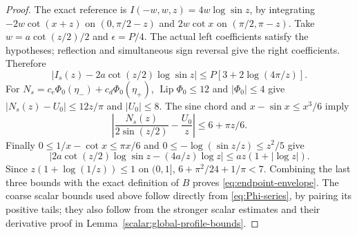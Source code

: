 \begin{proof}
The exact reference is $I(-w,w,z)=4w\log\sin z$, by integrating
$-2w\cot(x+z)$ on $(0,\pi/2-z)$ and $2w\cot x$ on
$(\pi/2,\pi-z)$. Take $w=a\cot(z/2)/2$ and $\epsilon=P/4$.
The actual left coefficients satisfy the hypotheses; reflection and
simultaneous sign reversal give the right coefficients. Therefore
\[
 |I_s(z)-2a\cot(z/2)\log\sin z|
                    \leq P[3+2\log(4\pi/z)].
\]
For $N_s=c_e\Phi_0(\eta_-)+c_d\Phi_0(\eta_+)$,
$\operatorname{Lip}\Phi_0\leq12$ and $|\Phi_0|\leq4$ give
$|N_s(z)-U_0|\leq12z/\pi$ and $|U_0|\leq8$.
The sine chord and $x-\sin x\leq x^3/6$ imply
\[
 \left|\frac{N_s(z)}{2\sin(z/2)}-\frac{U_0}z\right|
             \leq6+\pi z/6.
\]
Finally $0\leq1/x-\cot x\leq\pi x/6$ and
$0\leq-\log(\sin z/z)\leq z^2/5$ give
\[
 |2a\cot(z/2)\log\sin z-(4a/z)\log z|
               \leq az(1+|\log z|).
\]
Since $z(1+\log(1/z))\leq1$ on $(0,1]$,
$6+\pi^2/24+1/\pi<7$. Combining the last three bounds with
the exact definition of $B$ proves \eqref{eq:endpoint-envelope}.
The coarse scalar bounds used above follow directly from
\eqref{eq:Phi-series}, by pairing its positive tails; they also follow
from the stronger scalar estimates and their derivative proof in
Lemma~\ref{scalar:global-profile-bounds}.
\end{proof}

